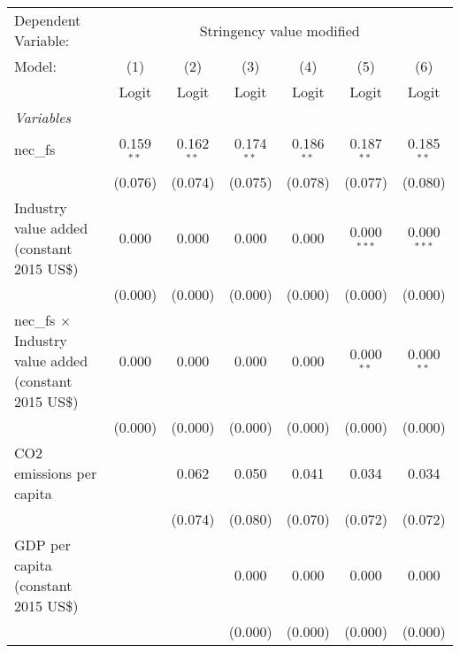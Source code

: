
\begingroup
\centering
\begin{tabular}{lcccccc}
   \toprule
   Dependent Variable: & \multicolumn{6}{c}{Stringency value modified}\\
   Model:                                                        & (1)          & (2)          & (3)          & (4)            & (5)            & (6)\\  
                                                                 &  Logit       & Logit        & Logit        & Logit          & Logit          & Logit\\  
   \midrule
   \emph{Variables}\\
   nec\_fs                                                       & 0.159$^{**}$ & 0.162$^{**}$ & 0.174$^{**}$ & 0.186$^{**}$   & 0.187$^{**}$   & 0.185$^{**}$\\   
                                                                 & (0.076)      & (0.074)      & (0.075)      & (0.078)        & (0.077)        & (0.080)\\   
   Industry value added (constant 2015 US\$)                     & 0.000        & 0.000        & 0.000        & 0.000          & 0.000$^{***}$  & 0.000$^{***}$\\   
                                                                 & (0.000)      & (0.000)      & (0.000)      & (0.000)        & (0.000)        & (0.000)\\   
   nec\_fs $\times$ Industry value added (constant 2015 US\$)    & 0.000        & 0.000        & 0.000        & 0.000          & 0.000$^{**}$   & 0.000$^{**}$\\   
                                                                 & (0.000)      & (0.000)      & (0.000)      & (0.000)        & (0.000)        & (0.000)\\   
   CO2 emissions per capita                                      &              & 0.062        & 0.050        & 0.041          & 0.034          & 0.034\\   
                                                                 &              & (0.074)      & (0.080)      & (0.070)        & (0.072)        & (0.072)\\   
   GDP per capita (constant 2015 US\$)                           &              &              & 0.000        & 0.000          & 0.000          & 0.000\\   
                                                                 &              &              & (0.000)      & (0.000)        & (0.000)        & (0.000)\\   

\end{tabular}
